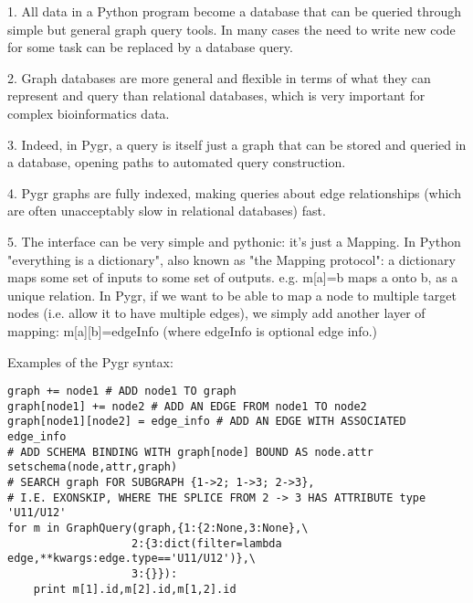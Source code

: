 \documentclass{howto}
\begin{document}
   1. All data in a Python program become a database  that can be queried through simple but general graph query tools.  In many cases the need to write new code for some task can be replaced by a database query. 

   2. Graph databases are more general and flexible in terms of what they can represent and query than relational databases, which is very important for complex bioinformatics data.

   3. Indeed, in Pygr, a query is itself just a graph that can be stored and queried in a database, opening paths to automated query construction.

   4. Pygr graphs are fully indexed, making queries about edge relationships (which are often unacceptably slow in relational databases) fast.

   5. The interface can be very simple and pythonic: it's just a Mapping.  In Python "everything is a dictionary", also known as "the Mapping protocol": a dictionary maps some set of inputs to some set of outputs. e.g. m[a]=b maps a onto b, as a unique relation.  In Pygr, if we want to be able to map a node to multiple target nodes (i.e. allow it to have multiple edges), we simply add another layer of mapping: m[a][b]=edgeInfo (where edgeInfo is optional edge info.)

Examples of the Pygr syntax:

\begin{verbatim}
graph += node1 # ADD node1 TO graph
graph[node1] += node2 # ADD AN EDGE FROM node1 TO node2
graph[node1][node2] = edge_info # ADD AN EDGE WITH ASSOCIATED edge_info
# ADD SCHEMA BINDING WITH graph[node] BOUND AS node.attr
setschema(node,attr,graph) 
# SEARCH graph FOR SUBGRAPH {1->2; 1->3; 2->3}, 
# I.E. EXONSKIP, WHERE THE SPLICE FROM 2 -> 3 HAS ATTRIBUTE type 'U11/U12' 
for m in GraphQuery(graph,{1:{2:None,3:None},\
                   2:{3:dict(filter=lambda edge,**kwargs:edge.type=='U11/U12')},\
                   3:{}}):
    print m[1].id,m[2].id,m[1,2].id
\end{verbatim}
\end{document}
